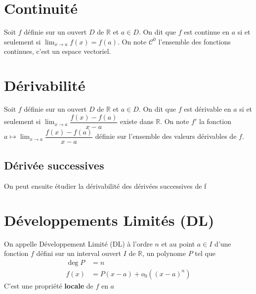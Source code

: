 \documentclass[11pt,colorlinks]{book}
\theoremstyle{mytheoremstyle}
\theoremstyle{mytheoremstyle}
\theoremstyle{mytheoremstyle}
\theoremstyle{mytheoremstyle}
\theoremstyle{mytheoremstyle}
\theoremstyle{mytheoremstyle}
\theoremstyle{mytheoremstyle}
\theoremstyle{mytheoremstyle}
\theoremstyle{myproblemstyle}
\def\mbb#1{\mathbb{#1}}
\def\bR{\mbb{R}}
\begin{document}
  \section{Continuité}
  \begin{definition}
    Soit $f$ définie sur un ouvert $D$ de $\bR$ et $a \in D$.  
    On dit que $f$ est continue en $a$ si et seulement si $\lim_{x \to a} f(x) = f(a)$.  
    On note $\mathcal{C}^0$ l'ensemble des fonctions continues, c'est un espace vectoriel.
  \end{definition}
  \section{Dérivabilité}
  \begin{definition}
    Soit $f$ définie sur un ouvert $D$ de $\bR$ et $a \in D$.  
    On dit que $f$ est dérivable en $a$ si et seulement si $\lim_{x \to a} \dfrac{f(x) - f(a)}{x - a}$ existe dans $\bR$.  
    On note $f'$ la fonction $a \mapsto \lim_{x \to a} \dfrac{f(x) - f(a)}{x - a}$ définie sur l'ensemble des valeurs dérivables de $f$.
  \end{definition}
  \subsection{Dérivée successives}
  On peut ensuite étudier la dérivabilité des dérivées successives de f
  \section{Développements Limités (DL)}
  \begin{definition}
    On appelle Développement Limité (DL) à l'ordre $n$ et au point $a \in I$ d'une fonction $f$ défini sur un interval ouvert $I$ de $\bR$, un polynome $P$ tel que
    \begin{align*}
      \deg P &= n \\ 
      f(x) &= P(x-a) + o_0((x-a)^n)
    \end{align*}
    C'est une propriété \textbf{locale} de $f$ en $a$ 
  \end{definition}
\end{document}
